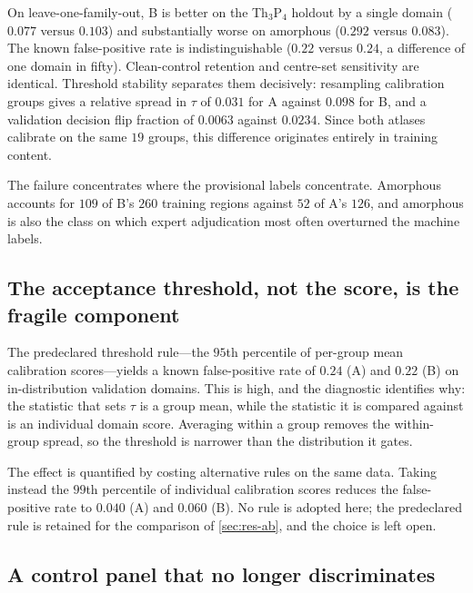On leave-one-family-out, B is better on the Th$_3$P$_4$ holdout by a single domain
($0.077$ versus $0.103$) and substantially worse on amorphous ($0.292$ versus $0.083$).
The known false-positive rate is indistinguishable ($0.22$ versus $0.24$, a difference of
one domain in fifty). Clean-control retention and centre-set sensitivity are identical.
Threshold stability separates them decisively: resampling calibration groups gives a
relative spread in $\tau$ of $0.031$ for A against $0.098$ for B, and a validation decision
flip fraction of $0.0063$ against $0.0234$. Since both atlases calibrate on the same $19$
groups, this difference originates entirely in training content.

The failure concentrates where the provisional labels concentrate. Amorphous accounts for
$109$ of B's $260$ training regions against $52$ of A's $126$, and amorphous is also the
class on which expert adjudication most often overturned the machine labels.

\subsection{The acceptance threshold, not the score, is the fragile component}
\label{sec:res-threshold}

The predeclared threshold rule---the $95$th percentile of per-group mean calibration
scores---yields a known false-positive rate of $0.24$ (A) and $0.22$ (B) on in-distribution
validation domains. This is high, and the diagnostic identifies why: the statistic that sets
$\tau$ is a group mean, while the statistic it is compared against is an individual domain
score. Averaging within a group removes the within-group spread, so the threshold is
narrower than the distribution it gates.

The effect is quantified by costing alternative rules on the same data. Taking instead the
$99$th percentile of individual calibration scores reduces the false-positive rate to
$0.040$ (A) and $0.060$ (B). No rule is adopted here; the predeclared rule is retained for
the comparison of \cref{sec:res-ab}, and the choice is left open.

\subsection{A control panel that no longer discriminates}
\label{sec:res-controls}

